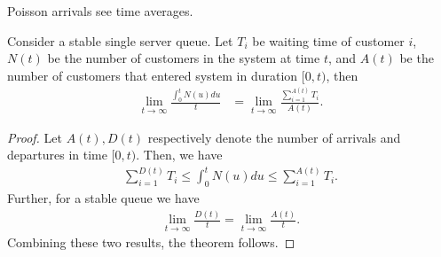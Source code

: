 \documentclass[a4paper,10pt,english]{article}
\begin{document}
\begin{thm}[PASTA] Poisson arrivals see time averages.
\end{thm}
\begin{thm} Consider a stable single server queue. Let $T_i$ be waiting time of customer $i$, $N(t)$ be the number of customers in the system at time $t$, and $A(t)$ be the number of customers that entered system in duration $[0,t)$, then
\begin{align*}
\lim_{t \to \infty}\frac{\int_{0}^tN(u)du}{t} &= \lim_{t \to \infty} \frac{\sum_{i=1}^{A(t)}T_i}{A(t)}.
\end{align*} 
\end{thm}
\begin{proof}
Let $A(t), D(t)$ respectively denote the number of arrivals and departures in time $[0,t)$. Then, we have 
\begin{align*}
\sum_{i=1}^{D(t)}T_i \leq \int_{0}^tN(u)du \leq \sum_{i=1}^{A(t)}T_i.
\end{align*}
Further, for a stable queue we have
\begin{align*}
\lim_{t \to \infty}\frac{D(t)}{t} = \lim_{t \to \infty}\frac{A(t)}{t}.
\end{align*}
Combining these two results, the theorem follows.
\end{proof}

\end{document}
